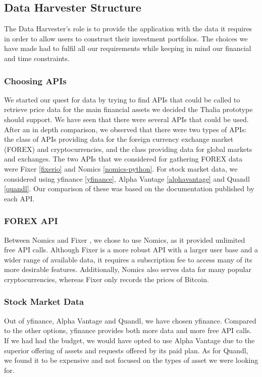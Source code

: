 \documentclass[main.tex]{subfiles}
\begin{document}
\subsection{Data Harvester Structure}

The Data Harvester's role is to provide the application with the data it requires in order to allow users to construct their investment portfolios. The choices we have made had to fulfil all our requirements while keeping in mind our financial and time constraints.

\subsubsection{Choosing APIs}
We started our quest for data by trying to find APIs that could be called to retrieve price data for the main financial assets we decided the Thalia prototype should support.
We have seen that there were several APIs that could be used. After an in depth comparison, we observed that there were two types of APIs: the class of APIs providing data for the foreign currency exchange market (FOREX) and cryptocurrencies, and the class providing data for global markets and exchanges. The two APIs that we considered for gathering FOREX data were Fixer \ref{fixerio} and Nomics \ref{nomics-python}. For stock market data, we considered using yfinance \ref{yfinance}, Alpha Vantage \ref{alphavantage} and Quandl \ref{quandl}. Our comparison of these was based on the documentation published by each API. \newline


\subsubsection*{FOREX API}
Between Nomics and Fixer \cite{fixerio}, we chose to use Nomics, as it provided unlimited free API calls. Although Fixer is a more robust API with a larger user base and a wider range of available data, it requires a subscription fee to access many of its more desirable features. Additionally, Nomics also serves data for many popular cryptocurrencies, whereas Fixer only records the prices of Bitcoin.  \newline

\subsubsection*{Stock Market Data}
Out of yfinance, Alpha Vantage \cite{alphavantage} and Quandl, we have chosen yfinance. Compared to the other options, yfinance provides both more data and more free API calls. If we had had the budget, we would have opted to use Alpha Vantage due to the superior offering of assets and requests offered by its paid plan. As for Quandl, we found it to be expensive and not focused on the types of asset we were looking for. 
\end{document}
